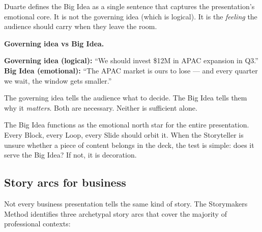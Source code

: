 Duarte defines the Big Idea as a single sentence that captures the presentation's emotional core. It is not the governing idea (which is logical). It is the \emph{feeling} the audience should carry when they leave the room.

\begin{diagnosisbox}
\textbf{Governing idea vs Big Idea.}

\vspace{6pt}
\textbf{Governing idea (logical):} ``We should invest \$12M in APAC expansion in Q3.''\\
\textbf{Big Idea (emotional):} ``The APAC market is ours to lose --- and every quarter we wait, the window gets smaller.''

\vspace{4pt}
The governing idea tells the audience what to decide. The Big Idea tells them why it \emph{matters}. Both are necessary. Neither is sufficient alone.
\end{diagnosisbox}

The Big Idea functions as the emotional north star for the entire presentation. Every Block, every Loop, every Slide should orbit it. When the Storyteller is unsure whether a piece of content belongs in the deck, the test is simple: does it serve the Big Idea? If not, it is decoration.


\subsection{Story arcs for business}

Not every business presentation tells the same kind of story. The Storymakers Method identifies three archetypal story arcs that cover the majority of professional contexts:


